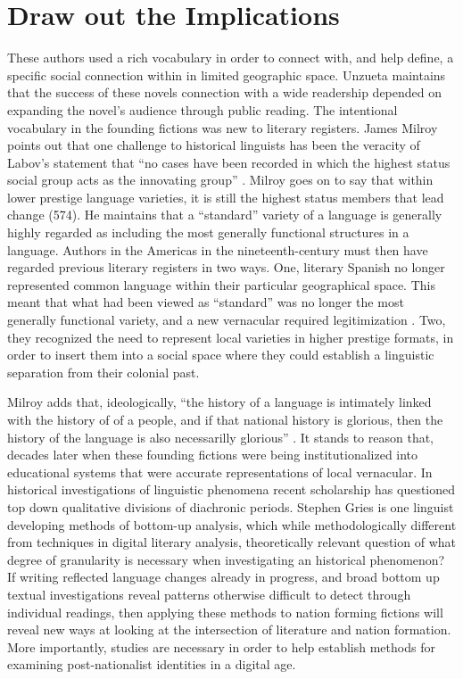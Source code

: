 \documentclass[12pt]{report}
\begin{document}
\section{Draw out the Implications}
These authors used a rich vocabulary in order to connect with, and help define, a specific social connection within in limited geographic space.
Unzueta maintains that the success of these novels connection with a wide readership depended on expanding the novel's audience through public reading.
The intentional vocabulary in the founding fictions was new to literary registers.
James Milroy points out that one challenge to historical linguists has been the veracity of Labov's statement that \enquote{no cases have been recorded in which the highest status social group acts as the innovating group} \autocite[574]{Milroy2012}.
Milroy goes on to say that within lower prestige language varieties, it is still the highest status members that lead change (574).
He maintains that a \enquote{standard} variety of a language is generally highly regarded as including the most generally functional structures in a language.
Authors in the Americas in the nineteenth-century must then have regarded previous literary registers in two ways.
One, literary Spanish no longer represented common language within their particular geographical space.
This meant that what had been viewed as \enquote{standard} was no longer the most generally functional variety, and a new vernacular required legitimization 	.
Two, they recognized the need to represent local varieties in higher prestige formats, in order to insert them into a social space where they could establish a linguistic separation from their colonial past.


Milroy adds that, ideologically, \enquote{the history of a language is intimately linked with the history of of a people, and if that national history is glorious, then the history of the language is also necessarilly glorious} \autocite[575]{Milroy2012}.
It stands to reason that, decades later when these founding fictions were being institutionalized into educational systems that were accurate representations of local vernacular.
In historical investigations of linguistic phenomena recent scholarship has questioned top down qualitative divisions of diachronic periods. 
Stephen Gries is one linguist developing methods of bottom-up analysis, which while methodologically different from techniques in digital literary analysis, theoretically relevant question of what degree of granularity is necessary when investigating an historical phenomenon? 
If writing reflected language changes already in progress, and broad bottom up textual investigations reveal patterns otherwise difficult to detect through individual readings, then applying these methods to nation forming fictions will reveal new ways at looking at the intersection of literature and nation formation.
More importantly, studies are necessary in order to help establish methods for examining post-nationalist identities in a digital age.


\end{document}
